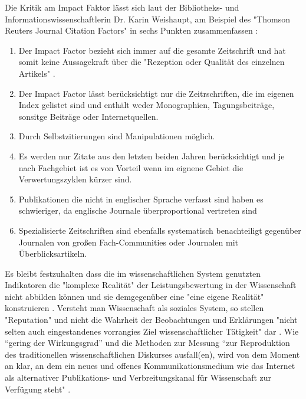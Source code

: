 Die Kritik am Impact Faktor lässt sich laut der Bibliotheks- und Informationswissenschaftlerin Dr. Karin Weishaupt, am Beispiel des "Thomson Reuters Journal Citation Factors" in sechs Punkten zusammenfassen \cite{weishaupt_2009_goldenOA}:
\begin{enumerate}
\item Der Impact Factor bezieht sich immer auf die gesamte Zeitschrift und hat somit keine Aussagekraft über die "Rezeption oder Qualität des einzelnen Artikels" .
\item Der Impact Factor lässt berücksichtigt nur die Zeitrschriften, die im eigenen Index gelistet sind und enthält weder Monographien, Tagungsbeiträge, sonsitge Beiträge oder Internetquellen.
\item Durch Selbstzitierungen sind Manipulationen möglich.
\item Es werden nur Zitate aus den letzten beiden Jahren berücksichtigt und je nach Fachgebiet ist es von Vorteil wenn im eignene Gebiet die Verwertungszyklen kürzer sind.
\item Publikationen die nicht in englischer Sprache verfasst sind haben es schwieriger, da englische Journale überproportional vertreten sind
\item Spezialisierte Zeitschriften sind ebenfalls systematisch benachteiligt gegenüber Journalen von großen Fach-Communities oder Journalen mit Überblicksartikeln.
\end{enumerate}

Es bleibt festzuhalten dass die im wissenschaftlichen System genutzten Indikatoren die "komplexe Realität" der Leistungsbewertung in der Wissenschaft nicht abbilden können und sie demgegenüber eine "eine eigene Realität" konstruieren \cite{Hornbostel_1997}. Versteht man Wissenschaft als soziales System, so stellen "Reputation" und nicht die Wahrheit der Beobachtungen und Erklärungen "nicht selten auch eingestandenes vorrangies Ziel wissenschaftlicher Tätigkeit" dar \cite{luhmann_1970_selbststeuerung}. Wie “gering der Wirkungsgrad” und die Methoden zur Messung “zur Reproduktion des traditionellen wissenschaftlichen Diskurses ausfall(en), wird von dem Moment an klar, an dem ein neues und offenes Kommunikationsmedium wie das Internet als alternativer Publikations- und Verbreitungskanal für Wissenschaft zur Verfügung steht" \cite{Rost_1998}. 


